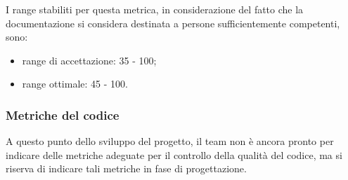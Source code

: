 		I range stabiliti per questa metrica, in considerazione del fatto che la documentazione si considera destinata a persone sufficientemente competenti, sono:
		\begin{itemize}
			\item range di accettazione: 35 - 100;
			\item range ottimale: 45 - 100.
		\end{itemize}
	\subsubsection{Metriche del codice}
		A questo punto dello sviluppo del progetto, il team non è ancora pronto per indicare delle metriche adeguate per il controllo della qualità del codice, ma si riserva di indicare tali metriche in fase di progettazione.
